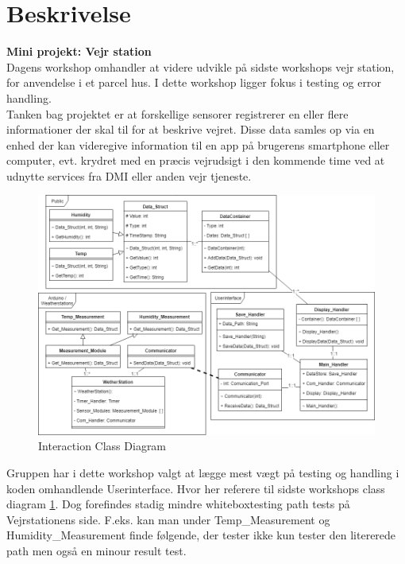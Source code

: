 \documentclass[11pt]{article}
\renewcommand{\baselinestretch}{1.20}
\begin{document}
    
    
    
    \renewcommand{\baselinestretch}{0.8}
    \tableofcontents
    \renewcommand{\baselinestretch}{1.20}
    \newpage
    
    \section{Beskrivelse}
    \textbf{Mini projekt: Vejr station}\\
    Dagens workshop omhandler at videre udvikle på sidste workshops vejr station, for anvendelse i et parcel hus. I dette workshop ligger fokus i testing og error handling.\\
    Tanken bag projektet er at forskellige sensorer registrerer en eller flere informationer der skal til for at beskrive vejret. Disse data samles op via en enhed der kan videregive information til en app på brugerens smartphone eller computer, evt. krydret med en præcis vejrudsigt i den kommende time ved at udnytte services fra DMI
    eller anden vejr tjeneste.
    
    \begin{figure}[H]
        \centering
        \includegraphics[width=1\textwidth,angle=0]{Struktureret_System_Udvikling/Workshop_2/Assets/Workshop2_ClassDiagram.png}
        \caption{Interaction Class Diagram}
        \label{fig:ClassDiagram}
    \end{figure}
    \noindent
    Gruppen har i dette workshop valgt at lægge mest vægt på testing og handling i koden omhandlende Userinterface. Hvor her referere til sidste workshops class diagram \ref{fig:ClassDiagram}.
    Dog forefindes stadig mindre whiteboxtesting path tests på Vejrstationens side. F.eks. kan man under Temp\_Measurement og Humidity\_Measurement finde følgende, der tester ikke kun tester den litererede path men også en minour result test.
    
\end{document}

